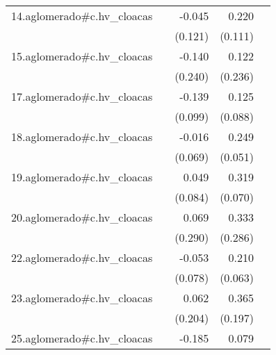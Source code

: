 {\begin{longtable}{l*{4}{D{.}{.}{-1}}}
\addlinespace
14.aglomerado#c.hv\_cloacas&                     &      -0.045         &       0.220\sym{*}  &                     \\
            &                     &     (0.121)         &     (0.111)         &                     \\
\addlinespace
15.aglomerado#c.hv\_cloacas&                     &      -0.140         &       0.122         &                     \\
            &                     &     (0.240)         &     (0.236)         &                     \\
\addlinespace
17.aglomerado#c.hv\_cloacas&                     &      -0.139         &       0.125         &                     \\
            &                     &     (0.099)         &     (0.088)         &                     \\
\addlinespace
18.aglomerado#c.hv\_cloacas&                     &      -0.016         &       0.249\sym{***}&                     \\
            &                     &     (0.069)         &     (0.051)         &                     \\
\addlinespace
19.aglomerado#c.hv\_cloacas&                     &       0.049         &       0.319\sym{***}&                     \\
            &                     &     (0.084)         &     (0.070)         &                     \\
\addlinespace
20.aglomerado#c.hv\_cloacas&                     &       0.069         &       0.333         &                     \\
            &                     &     (0.290)         &     (0.286)         &                     \\
\addlinespace
22.aglomerado#c.hv\_cloacas&                     &      -0.053         &       0.210\sym{***}&                     \\
            &                     &     (0.078)         &     (0.063)         &                     \\
\addlinespace
23.aglomerado#c.hv\_cloacas&                     &       0.062         &       0.365         &                     \\
            &                     &     (0.204)         &     (0.197)         &                     \\
\addlinespace
25.aglomerado#c.hv\_cloacas&                     &      -0.185\sym{*}  &       0.079         &                     \\

\end{longtable}}
